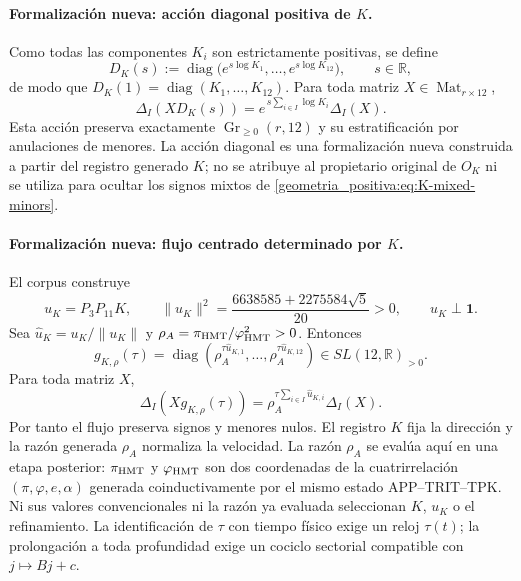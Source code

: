 \paragraph{Formalización nueva: acción diagonal positiva de \(K\).}
Como todas las componentes \(K_i\) son estrictamente positivas, se define
\begin{equation}
 D_K(s):=\operatorname{diag}
 \bigl(e^{s\log K_1},\ldots,e^{s\log K_{12}}\bigr),
 \qquad s\in\mathbb R,
 \label{geometria_positiva:eq:K-positive-diagonal-flow}
\end{equation}
de modo que \(D_K(1)=\operatorname{diag}(K_1,\ldots,K_{12})\). Para toda
matriz \(X\in\operatorname{Mat}_{r\times12}\),
\begin{equation}
 \Delta_I(XD_K(s))
 =e^{\,s\sum_{i\in I}\log K_i}\Delta_I(X).
 \label{geometria_positiva:eq:K-diagonal-minors}
\end{equation}
Esta acción preserva exactamente
\(\operatorname{Gr}_{\ge0}(r,12)\) y su estratificación por anulaciones de
menores. La acción diagonal es una formalización nueva construida a partir del
registro generado \(K\); no se atribuye al propietario original de \(O_K\) ni
se utiliza para ocultar los signos mixtos de \eqref{geometria_positiva:eq:K-mixed-minors}.

\paragraph{Formalización nueva: flujo centrado determinado por \(K\).}
El corpus construye
\begin{equation}
 u_K=P_3P_{11}K,\qquad
 \|u_K\|^2=
 \frac{6638585+2275584\sqrt5}{20}>0,
 \qquad u_K\perp\mathbf1.
 \label{geometria_positiva:eq:K-centered-direction}
\end{equation}
Sea \(\widehat u_K=u_K/\|u_K\|\) y
\(\rho_A=\pi_{\rm HMT}/\varphi_{\rm HMT}^2>0\). Entonces
\begin{equation}
 g_{K,\rho}(\tau)=
 \operatorname{diag}\!\left(
 \rho_A^{\tau\widehat u_{K,1}},\ldots,
 \rho_A^{\tau\widehat u_{K,12}}\right)
 \in SL(12,\mathbb R)_{>0}.
 \label{geometria_positiva:eq:K-centered-positive-flow}
\end{equation}
Para toda matriz \(X\),
\begin{equation}
 \Delta_I(Xg_{K,\rho}(\tau))
 =\rho_A^{\tau\sum_{i\in I}\widehat u_{K,i}}\Delta_I(X).
 \label{geometria_positiva:eq:K-centered-flow-minors}
\end{equation}
Por tanto el flujo preserva signos y menores nulos. El registro \(K\) fija la
dirección y la razón generada \(\rho_A\) normaliza la velocidad. La
razón \(\rho_A\) se evalúa aquí en una etapa posterior: \(\pi_{\rm HMT}\) y
\(\varphi_{\rm HMT}\) son dos coordenadas de la cuatrirrelación
\((\pi,\varphi,e,\alpha)\) generada coinductivamente por el mismo estado
APP--TRIT--TPK\@. Ni sus valores convencionales ni la razón ya evaluada
seleccionan \(K\), \(u_K\) o el refinamiento. La
identificación de \(\tau\) con tiempo físico exige un reloj \(\tau(t)\); la
prolongación a toda profundidad exige un cociclo sectorial compatible con
\(j\mapsto Bj+c\).

